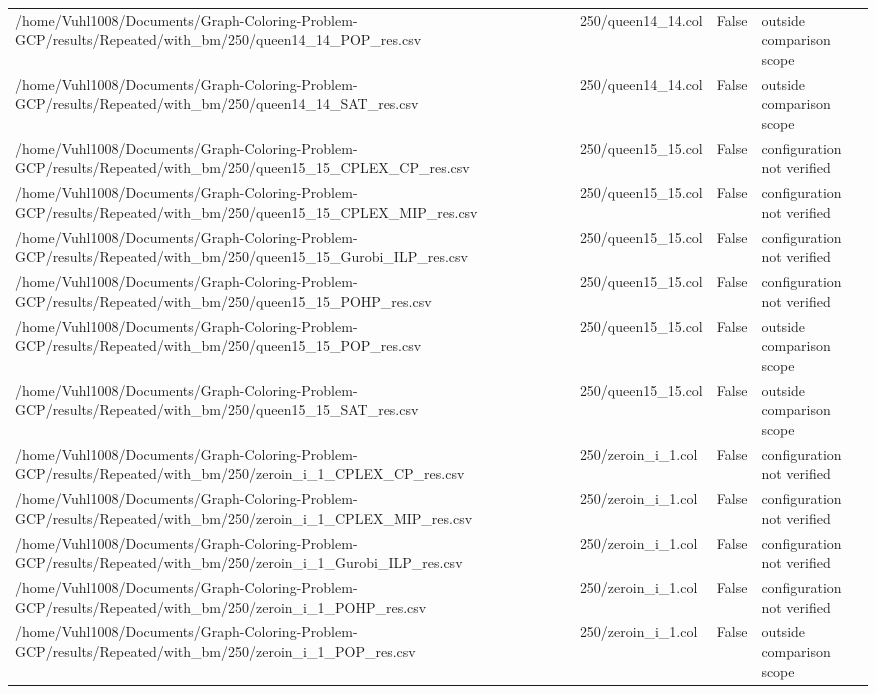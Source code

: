 \begin{table}[htbp]
\begin{tabular}{llll}
/home/Vuhl1008/Documents/Graph-Coloring-Problem-GCP/results/Repeated/with\_bm/250/queen14\_14\_POP\_res.csv & 250/queen14\_14.col & False & outside comparison scope \\
/home/Vuhl1008/Documents/Graph-Coloring-Problem-GCP/results/Repeated/with\_bm/250/queen14\_14\_SAT\_res.csv & 250/queen14\_14.col & False & outside comparison scope \\
/home/Vuhl1008/Documents/Graph-Coloring-Problem-GCP/results/Repeated/with\_bm/250/queen15\_15\_CPLEX\_CP\_res.csv & 250/queen15\_15.col & False & configuration not verified \\
/home/Vuhl1008/Documents/Graph-Coloring-Problem-GCP/results/Repeated/with\_bm/250/queen15\_15\_CPLEX\_MIP\_res.csv & 250/queen15\_15.col & False & configuration not verified \\
/home/Vuhl1008/Documents/Graph-Coloring-Problem-GCP/results/Repeated/with\_bm/250/queen15\_15\_Gurobi\_ILP\_res.csv & 250/queen15\_15.col & False & configuration not verified \\
/home/Vuhl1008/Documents/Graph-Coloring-Problem-GCP/results/Repeated/with\_bm/250/queen15\_15\_POHP\_res.csv & 250/queen15\_15.col & False & configuration not verified \\
/home/Vuhl1008/Documents/Graph-Coloring-Problem-GCP/results/Repeated/with\_bm/250/queen15\_15\_POP\_res.csv & 250/queen15\_15.col & False & outside comparison scope \\
/home/Vuhl1008/Documents/Graph-Coloring-Problem-GCP/results/Repeated/with\_bm/250/queen15\_15\_SAT\_res.csv & 250/queen15\_15.col & False & outside comparison scope \\
/home/Vuhl1008/Documents/Graph-Coloring-Problem-GCP/results/Repeated/with\_bm/250/zeroin\_i\_1\_CPLEX\_CP\_res.csv & 250/zeroin\_i\_1.col & False & configuration not verified \\
/home/Vuhl1008/Documents/Graph-Coloring-Problem-GCP/results/Repeated/with\_bm/250/zeroin\_i\_1\_CPLEX\_MIP\_res.csv & 250/zeroin\_i\_1.col & False & configuration not verified \\
/home/Vuhl1008/Documents/Graph-Coloring-Problem-GCP/results/Repeated/with\_bm/250/zeroin\_i\_1\_Gurobi\_ILP\_res.csv & 250/zeroin\_i\_1.col & False & configuration not verified \\
/home/Vuhl1008/Documents/Graph-Coloring-Problem-GCP/results/Repeated/with\_bm/250/zeroin\_i\_1\_POHP\_res.csv & 250/zeroin\_i\_1.col & False & configuration not verified \\
/home/Vuhl1008/Documents/Graph-Coloring-Problem-GCP/results/Repeated/with\_bm/250/zeroin\_i\_1\_POP\_res.csv & 250/zeroin\_i\_1.col & False & outside comparison scope \\

\end{tabular}
\end{table}
